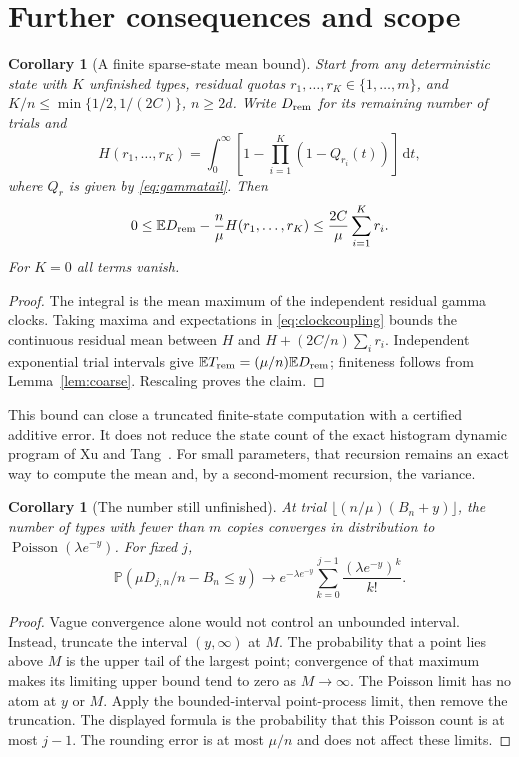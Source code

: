 \documentclass[11pt]{article}
\newtheorem{corollary}[theorem]{Corollary}
\theoremstyle{remark}\newtheorem{remark}[theorem]{Remark}
\newcommand{\Pbb}{\mathbb P}
\newcommand{\Ebb}{\mathbb E}
\newcommand{\dd}{\,\mathrm d}
\begin{document}
\section{Further consequences and scope}
\begin{corollary}[A finite sparse-state mean bound]\label{cor:finite}
Start from any deterministic state with $K$ unfinished types, residual quotas
$r_1,\ldots,r_K\in\{1,\ldots,m\}$, and
$K/n\le\min\{1/2,1/(2C)\}$, $n\ge2d$.
Write $D_{\rm rem}$ for its remaining number of trials and
\[
 H(r_1,\ldots,r_K)=\int_0^\infty
   \left[1-\prod_{i=1}^K(1-Q_{r_i}(t))\right]\dd t,
\]
where $Q_r$ is given by \eqref{eq:gammatail}. Then
\[
 0\le\Ebb D_{\rm rem}-\frac n\mu H(r_1,\ldots,r_K)
 \le\frac{2C}{\mu}\sum_{i=1}^K r_i.
\]
For $K=0$ all terms vanish.
\end{corollary}
\begin{proof}
The integral is the mean maximum of the independent residual gamma clocks.
Taking maxima and expectations in \eqref{eq:clockcoupling} bounds the
continuous residual mean between $H$ and
$H+(2C/n)\sum_i r_i$. Independent exponential trial intervals give
$\Ebb T_{\rm rem}=(\mu/n)\Ebb D_{\rm rem}$; finiteness follows from
Lemma~\ref{lem:coarse}. Rescaling proves the claim.
\end{proof}

This bound can close a truncated finite-state computation with a certified
additive error. It does not reduce the state count of the exact histogram
dynamic program of Xu and Tang~\cite{XuTang}. For small parameters, that
recursion remains an exact way to compute the mean and, by a second-moment
recursion, the variance.

\begin{corollary}[The number still unfinished]\label{cor:counts}
At trial $\lfloor(n/\mu)(B_n+y)\rfloor$, the number of types with fewer
than $m$ copies converges in distribution to
$\operatorname{Poisson}(\lambda e^{-y})$.
For fixed $j$,
\[
 \Pbb(\mu D_{j,n}/n-B_n\le y)\longrightarrow
 e^{-\lambda e^{-y}}\sum_{k=0}^{j-1}\frac{(\lambda e^{-y})^k}{k!}.
\]
\end{corollary}
\begin{proof}
Vague convergence alone would not control an unbounded interval.
Instead, truncate the interval $(y,\infty)$ at $M$. The probability that a
point lies above $M$ is the upper tail of the largest point; convergence of
that maximum makes its limiting upper bound tend to zero as $M\to\infty$.
The Poisson limit has no atom at $y$ or $M$. Apply the bounded-interval
point-process limit, then remove the truncation. The displayed formula is
the probability that this Poisson count is at most $j-1$.
The rounding error is at most $\mu/n$ and does not affect these limits.
\end{proof}
\end{document}
